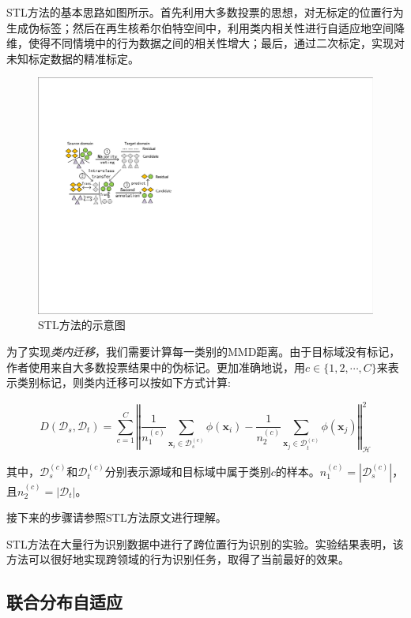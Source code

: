 STL方法的基本思路如图所示。首先利用大多数投票的思想，对无标定的位置行为生成伪标签；然后在再生核希尔伯特空间中，利用类内相关性进行自适应地空间降维，使得不同情境中的行为数据之间的相关性增大；最后，通过二次标定，实现对未知标定数据的精准标定。

\begin{figure}[htbp]
	\centering
	\includegraphics[scale=0.85]{./figures/fig-distribution-stl.pdf}
	\caption{STL方法的示意图}
	\label{fig-distribution-stl}
\end{figure}

为了实现\textit{类内迁移}，我们需要计算每一类别的MMD距离。由于目标域没有标记，作者使用来自大多数投票结果中的伪标记。更加准确地说，用$c \in \{1, 2, \cdots, C\}$来表示类别标记，则类内迁移可以按如下方式计算:

\begin{equation}
\label{equ-stl-stra}
D(\mathcal{D}_{s},\mathcal{D}_{t})
=\sum_{c=1}^{C}\left \Vert \frac{1}{n^{(c)}_1} \sum_{\mathbf{x}_i \in \mathcal{D}^{(c)}_s} \phi(\mathbf{x}_i) - \frac{1}{n^{(c)}_2} \sum_{\mathbf{x}_j \in \mathcal{D}^{(c)}_t} \phi(\mathbf{x}_j) \right \Vert ^2_\mathcal{H}
\end{equation}

其中，$\mathcal{D}^{(c)}_s$和$\mathcal{D}^{(c)}_t$分别表示源域和目标域中属于类别$c$的样本。$n^{(c)}_1=|\mathcal{D}^{(c)}_s|$，且$n^{(c)}_2=|\mathcal{D}_t|$。

接下来的步骤请参照STL方法原文进行理解。

STL方法在大量行为识别数据中进行了跨位置行为识别的实验。实验结果表明，该方法可以很好地实现跨领域的行为识别任务，取得了当前最好的效果。

\subsection{联合分布自适应}

